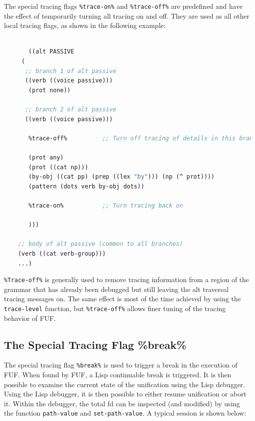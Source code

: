 \documentclass[10pt,a4paper]{report}
\begin{document}
The special tracing flags {\tt \%trace-on\%} and {\tt \%trace-off\%} are predefined
and have the effect of temporarily turning all tracing on and off.  They
are used as all other local tracing flags, as shown in the following
example:

\begin{lstlisting}[language=Lisp]

       ((alt PASSIVE
	 (
	  ;; branch 1 of alt passive
	  ((verb ((voice passive)))
	   (prot none))
	  
	  ;; branch 2 of alt passive
	  ((verb ((voice passive)))

	   %trace-off%          ;; Turn off tracing of details in this branch

	   (prot any)
	   (prot ((cat np)))
	   (by-obj ((cat pp) (prep ((lex "by"))) (np (^ prot))))
	   (pattern (dots verb by-obj dots))

	   %trace-on%           ;; Turn tracing back on

	   )))

	;; body of alt passive (common to all branches)
	(verb ((cat verb-group)))
	...)

\end{lstlisting}

{\tt \%Trace-off\%} is generally used to remove tracing information from
a region of the grammar that has already been debugged but still leaving
the alt traversal tracing messages on.  The same effect is most of the
time achieved by using the {\tt trace-level} function, but {\tt \%trace-off\%}
allows finer tuning of the tracing behavior of FUF.


\subsection{The Special Tracing Flag \%break\%}

The special tracing flag {\tt \%break\%} is used to trigger a break in the
execution of FUF.  When found by FUF, a Lisp continuable break is
triggered.  It is then possible to examine the current state of the
unification using the Lisp debugger.  Using the Lisp debugger, it is then
possible to either resume unification or abort it.  Within the debugger,
the total fd can be inspected (and modified) by using the function
{\tt path-value} and {\tt set-path-value}.  A typical session is shown below:
\end{document}
